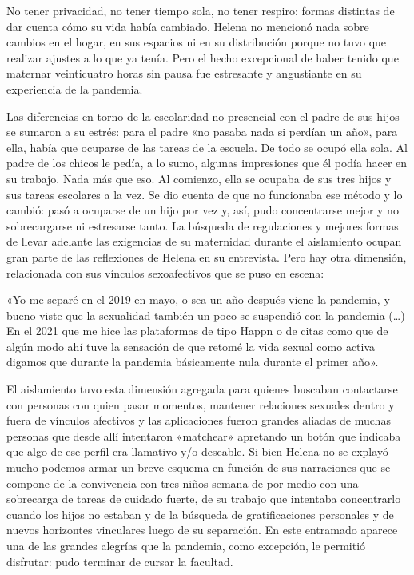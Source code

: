 \begin{refsection}
\begin{gbcita}
\end{gbcita}

No tener privacidad, no tener tiempo sola, no tener respiro: formas distintas de dar cuenta cómo su vida había cambiado. Helena no mencionó nada sobre cambios en el hogar, en sus espacios ni en su distribución porque no tuvo que realizar ajustes a lo que ya tenía. Pero el hecho excepcional de haber tenido que maternar veinticuatro horas sin pausa fue estresante y angustiante en su experiencia de la pandemia.

Las diferencias en torno de la escolaridad no presencial con el padre de sus hijos se sumaron a su estrés: para el padre «no pasaba nada si perdían un año», para ella, había que ocuparse de las tareas de la escuela. De todo se ocupó ella sola. Al padre de los chicos le pedía, a lo sumo, algunas impresiones que él podía hacer en su trabajo. Nada más que eso. Al comienzo, ella se ocupaba de sus tres hijos y sus tareas escolares a la vez. Se dio cuenta de que no funcionaba ese método y lo cambió: pasó a ocuparse de un hijo por vez y, así, pudo concentrarse mejor y no sobrecargarse ni estresarse tanto. La búsqueda de regulaciones y mejores formas de llevar adelante las exigencias de su maternidad durante el aislamiento ocupan gran parte de las reflexiones de Helena en su entrevista. Pero hay otra dimensión, relacionada con sus vínculos sexoafectivos que se puso en escena:


\begin{gbcita}
«Yo me separé en el 2019 en mayo, o sea un año después viene la pandemia, y bueno viste que la sexualidad también un poco se suspendió con la pandemia (…) En el 2021 que me hice las plataformas de tipo Happn o de citas como que de algún modo ahí tuve la sensación de que retomé la vida sexual como activa digamos que durante la pandemia básicamente nula durante el primer año».

\end{gbcita}

El aislamiento tuvo esta dimensión agregada para quienes buscaban contactarse con personas con quien pasar momentos, mantener relaciones sexuales dentro y fuera de vínculos afectivos y las aplicaciones fueron grandes aliadas de muchas personas que desde allí intentaron «matchear» apretando un botón que indicaba que algo de ese perfil era llamativo y/o deseable. Si bien Helena no se explayó mucho podemos armar un breve esquema en función de sus narraciones que se compone de la convivencia con tres niños semana de por medio con una sobrecarga de tareas de cuidado fuerte, de su trabajo que intentaba concentrarlo cuando los hijos no estaban y de la búsqueda de gratificaciones personales y de nuevos horizontes vinculares luego de su separación. En este entramado aparece una de las grandes alegrías que la pandemia, como excepción, le permitió disfrutar: pudo terminar de cursar la facultad.



\end{refsection}

